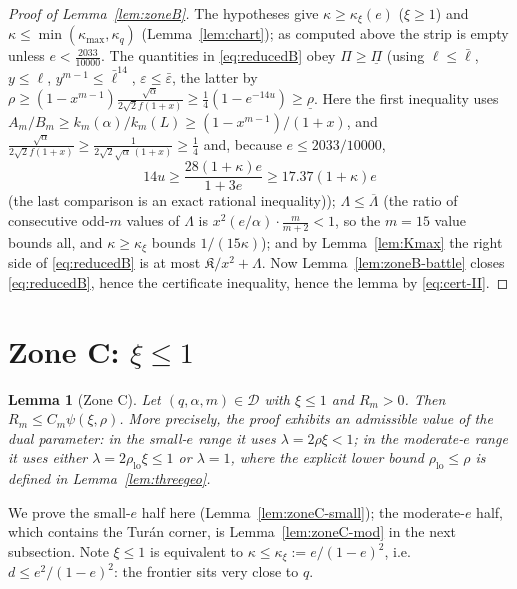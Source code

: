 \documentclass[11pt]{article}
\newtheorem{lemma}[theorem]{Lemma}
\newcommand{\eps}{\varepsilon}
\begin{document}
\begin{proof}[Proof of Lemma~\ref{lem:zoneB}]
The hypotheses give $\kappa\ge\kappa_\xi(e)$ ($\xi\ge1$) and
$\kappa\le\min(\kappa_{\max},\kappa_q)$ (Lemma~\ref{lem:chart}); as computed
above the strip is empty unless $e<\tfrac{2033}{10000}$.  The quantities in
\eqref{eq:reducedB} obey
$\Pi\ge\underline\Pi$ (using $\ell\le\bar\ell$, $y\le\ell$,
$y^{m-1}\le\bar\ell^{14}$, $\eps\le\bar\eps$, the latter by
$\rho\ge(1-x^{m-1})\frac{\sqrt\alpha}{2\sqrt2f(1+x)}
\ge\tfrac14(1-e^{-14u})\ge\underline\rho$.  Here the first inequality
uses
$A_m/B_m\ge k_m(\alpha)/k_m(L)\ge(1-x^{m-1})/(1+x)$, and
$\frac{\sqrt\alpha}{2\sqrt2f(1+x)}\ge\frac1{2\sqrt2\sqrt\alpha\,(1+x)}
\ge\tfrac14$ and, because $e\le2033/10000$,
\[
 14u\ge \frac{28(1+\kappa)e}{1+3e}
 \ge17.37(1+\kappa)e
\]
(the last comparison is an exact rational inequality));
$\Lambda\le\overline\Lambda$ (the ratio of consecutive odd-$m$ values of
$\Lambda$ is $x^2(e/\alpha)\cdot\frac m{m+2}<1$, so the $m=15$ value bounds
all, and $\kappa\ge\kappa_\xi$ bounds $1/(15\kappa)$); and by
Lemma~\ref{lem:Kmax} the right side of \eqref{eq:reducedB} is at most
$\mathfrak K/x^2+\Lambda$.  Now Lemma~\ref{lem:zoneB-battle} closes
\eqref{eq:reducedB}, hence the certificate inequality, hence the lemma by
\eqref{eq:cert-II}.
\end{proof}

\section{Zone C: \texorpdfstring{$\xi\le1$}{xi <= 1}}\label{sec:zoneC}

\begin{lemma}[Zone C]\label{lem:zoneC}
Let $(q,\alpha,m)\in\mathcal D$ with $\xi\le1$ and $R_m>0$.  Then
$R_m\le C_m\psi(\xi,\rho)$.  More precisely, the proof exhibits an
admissible value of the dual parameter: in the small-$e$ range it uses
$\lambda=2\rho\xi<1$; in the moderate-$e$ range it uses either
$\lambda=2\rho_{\mathrm{lo}}\xi\le1$ or $\lambda=1$, where the explicit
lower bound $\rho_{\mathrm{lo}}\le\rho$ is defined in
Lemma~\ref{lem:threegeo}.
\end{lemma}

We prove the small-$e$ half here (Lemma~\ref{lem:zoneC-small}); the
moderate-$e$ half, which contains the Tur\'an corner, is
Lemma~\ref{lem:zoneC-mod} in the next subsection.  Note $\xi\le1$ is
equivalent to $\kappa\le\kappa_\xi:=e/(1-e)^2$, i.e.\ $d\le e^2/(1-e)^2$: the
frontier sits very close to $q$.
\end{document}
